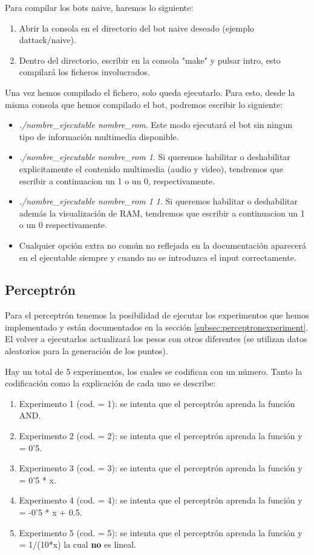 Para compilar los bots naive, haremos lo siguiente:

\begin{enumerate}
	\item Abrir la consola en el directorio del bot naive deseado (ejemplo dattack/naive).
	\item Dentro del directorio, escribir en la consola "make" y pulsar intro, esto compilará los ficheros involucrados.
\end{enumerate}

Una vez hemos compilado el fichero, solo queda ejecutarlo. Para esto, desde la misma consola que hemos compilado el bot, podremos escribir lo siguiente:

\begin{itemize}
	\item \textit{./nombre\_ejecutable nombre\_rom}. Este modo ejecutará el bot sin ningun tipo de información multimedia disponible.
	\item \textit{./nombre\_ejecutable nombre\_rom 1}. Si queremos habilitar o deshabilitar explicitamente el contenido multimedia (audio y video), tendremos que escribir a continuacion un 1 o un 0, respectivamente.
	\item \textit{./nombre\_ejecutable nombre\_rom 1 1}. Si queremos habilitar o deshabilitar además la visualización de RAM, tendremos que escribir a continuacion un 1 o un 0 respectivamente.
	\item Cualquier opción extra no común no reflejada en la documentación aparecerá en el ejecutable siempre y cuando no se introduzca el input correctamente.
\end{itemize}

\newpage
\subsection{Perceptrón}

Para el perceptrón tenemos la posibilidad de ejecutar los experimentos que hemos implementado y están documentados en la sección \ref{subsec:perceptronexperiment}. El volver a ejecutarlos actualizará los pesos con otros diferentes (se utilizan datos aleatorios para la generación de los puntos).

Hay un total de 5 experimentos, los cuales se codifican con un número. Tanto la codificación como la explicación de cada uno se describe:

\begin{enumerate}
    \item Experimento 1 (cod. = 1): se intenta que el perceptrón aprenda la función AND.
    \item Experimento 2 (cod. = 2): se intenta que el perceptrón aprenda la función y = 0'5.
    \item Experimento 3 (cod. = 3): se intenta que el perceptrón aprenda la función y = 0'5 * x.
    \item Experimento 4 (cod. = 4): se intenta que el perceptrón aprenda la función y = -0'5 * x + 0.5.
    \item Experimento 5 (cod. = 5): se intenta que el perceptrón aprenda la función y = 1/(10*x) la cual \textbf{no} es lineal.
\end{enumerate}

